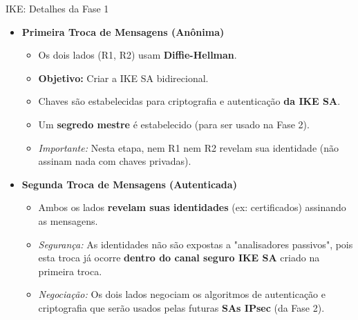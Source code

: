 \begin{frame}{IKE: Detalhes da Fase 1}
    \begin{itemize}
        \item \textbf{Primeira Troca de Mensagens (Anônima)}
              \begin{itemize}
                  \item Os dois lados (R1, R2) usam \textbf{Diffie-Hellman}.
                  \item \textbf{Objetivo:} Criar a IKE SA bidirecional.
                  \item Chaves são estabelecidas para criptografia e autenticação \textbf{da IKE SA}.
                  \item Um \textbf{segredo mestre} é estabelecido (para ser usado na Fase 2).
                  \item \textit{Importante:} Nesta etapa, nem R1 nem R2 revelam sua identidade (não assinam nada com chaves privadas).
              \end{itemize}

        \item \textbf{Segunda Troca de Mensagens (Autenticada)}
              \begin{itemize}
                  \item Ambos os lados \textbf{revelam suas identidades} (ex: certificados) assinando as mensagens.
                  \item \textit{Segurança:} As identidades não são expostas a "analisadores passivos", pois esta troca já ocorre \textbf{dentro do canal seguro IKE SA} criado na primeira troca.
                  \item \textit{Negociação:} Os dois lados negociam os algoritmos de autenticação e criptografia que serão usados pelas futuras \textbf{SAs IPsec} (da Fase 2).
              \end{itemize}
    \end{itemize}
\end{frame}

